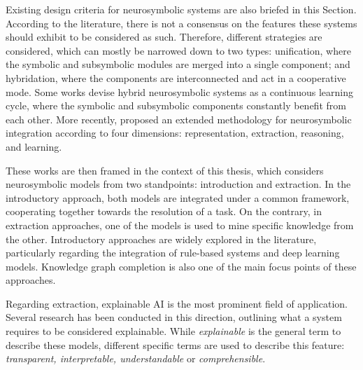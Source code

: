 Existing design criteria for neurosymbolic systems are also briefed in this Section. According to the literature, there is not a consensus on the features these systems should exhibit to be considered as such. Therefore, different strategies are considered, which can mostly be narrowed down to two types: unification, where the symbolic and subsymbolic modules are merged into a single component; and hybridation, where the components are interconnected and act in a cooperative mode. Some works devise hybrid neurosymbolic systems as a continuous learning cycle, where the symbolic and subsymbolic components constantly benefit from each other. More recently, \cite{garcez_neural-symbolic_2019} proposed an extended methodology for neurosymbolic integration according to four dimensions: representation, extraction, reasoning, and learning.

These works are then framed in the context of this thesis, which considers neurosymbolic models from two standpoints: introduction and extraction. In the introductory approach, both models are integrated under a common framework, cooperating together towards the resolution of a task. On the contrary, in extraction approaches, one of the models is used to mine specific knowledge from the other. Introductory approaches are widely explored in the literature, particularly regarding the integration of rule-based systems and deep learning models. Knowledge graph completion is also one of the main focus points of these approaches. 

Regarding extraction, explainable AI is the most prominent field of application. Several research has been conducted in this direction, outlining what a system requires to be considered explainable. While \textit{explainable} is the general term to describe these models, different specific terms are used to describe this feature: \textit{transparent, interpretable, understandable} or \textit{comprehensible}. 
